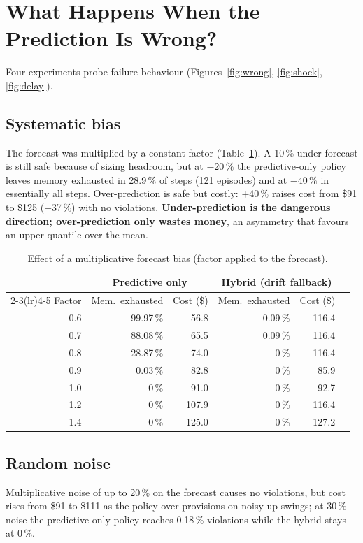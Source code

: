 \documentclass[11pt,a4paper]{article}
\begin{document}
\section{What Happens When the Prediction Is Wrong?}\label{sec:wrong}
Four experiments probe failure behaviour (Figures~\ref{fig:wrong}, \ref{fig:shock}, \ref{fig:delay}).

\subsection{Systematic bias}
The forecast was multiplied by a constant factor (Table~\ref{tab:bias}). A 10\,\% under-forecast is still safe because of sizing headroom, but at $-20\,\%$ the predictive-only policy leaves memory exhausted in 28.9\,\% of steps (121 episodes) and at $-40\,\%$ in essentially all steps. Over-prediction is safe but costly: $+40\,\%$ raises cost from \$91 to \$125 (+37\,\%) with no violations. \textbf{Under-prediction is the dangerous direction; over-prediction only wastes money}, an asymmetry that favours an upper quantile over the mean.

\begin{table}[H]
\centering\caption{Effect of a multiplicative forecast bias (factor applied to the forecast).}\label{tab:bias}
\small
\begin{tabular}{rrrrrr}
\toprule
 & \multicolumn{2}{c}{Predictive only} & \multicolumn{2}{c}{Hybrid (drift fallback)}\\
\cmidrule(lr){2-3}\cmidrule(lr){4-5}
Factor & Mem.\ exhausted & Cost (\$) & Mem.\ exhausted & Cost (\$)\\
\midrule
0.6 & 99.97\,\% & 56.8 & 0.09\,\% & 116.4\\
0.7 & 88.08\,\% & 65.5 & 0.09\,\% & 116.4\\
0.8 & 28.87\,\% & 74.0 & 0\,\% & 116.4\\
0.9 & 0.03\,\% & 82.8 & 0\,\% & 85.9\\
1.0 & 0\,\% & 91.0 & 0\,\% & 92.7\\
1.2 & 0\,\% & 107.9 & 0\,\% & 116.4\\
1.4 & 0\,\% & 125.0 & 0\,\% & 127.2\\
\bottomrule
\end{tabular}
\end{table}

\subsection{Random noise}
Multiplicative noise of up to 20\,\% on the forecast causes no violations, but cost rises from \$91 to \$111 as the policy over-provisions on noisy up-swings; at 30\,\% noise the predictive-only policy reaches 0.18\,\% violations while the hybrid stays at 0\,\%.
\end{document}
